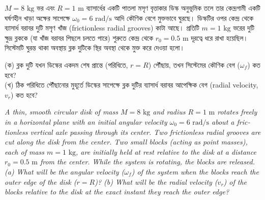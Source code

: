 \documentclass[12pt, a4paper]{article}
\begin{document}
\begin{tcolorbox}[questionbox={প্রশ্ন (Question) 7}]
\noindent
$M = 8\text{ kg}$ ভর এবং $R = 1\text{ m}$ ব্যাসার্ধের একটি পাতলা মসৃণ বৃত্তাকার ডিস্ক অনুভূমিক তলে তার কেন্দ্রগামী একটি ঘর্ষণহীন খাড়া অক্ষের সাপেক্ষে $\omega_0 = 6\text{ rad/s}$ আদি কৌণিক বেগে মুক্তভাবে ঘুরছে। ডিস্কটির ওপর কেন্দ্র থেকে ব্যাসার্ধ বরাবর দুটি মসৃণ খাঁজ (frictionless radial grooves) কাটা আছে। প্রতিটি $m = 1\text{ kg}$ ভরের দুটি ক্ষুদ্র ব্লককে (যা খাঁজ বরাবর পিছলে চলতে পারে) শুরুতে কেন্দ্র থেকে $r_0 = 0.5\text{ m}$ দূরত্বে ধরে রাখা হয়েছিল। সিস্টেমটি ঘুরন্ত থাকা অবস্থায় ব্লক দুটিকে স্থির অবস্থা থেকে মুক্ত করে দেওয়া হলো। 

\vspace{0.3em}
\noindent
(ক) ব্লক দুটি যখন ডিস্কের একদম শেষ প্রান্তে (পরিধিতে, $r = R$) পৌঁছায়, তখন সিস্টেমের কৌণিক বেগ ($\omega_f$) কত হবে? \\
(খ) ঠিক পরিধিতে পৌঁছানোর মুহূর্তে ডিস্কের সাপেক্ষে ব্লক দুটির ব্যাসার্ধ বরাবর আপেক্ষিক বেগ (radial velocity, $v_r$) কত হবে?

\vspace{0.8em}
\begin{english}
\noindent\textit{\color{darkgray}
A thin, smooth circular disk of mass $M = 8\text{ kg}$ and radius $R = 1\text{ m}$ rotates freely in a horizontal plane with an initial angular velocity $\omega_0 = 6\text{ rad/s}$ about a frictionless vertical axle passing through its center. Two frictionless radial grooves are cut along the disk from the center. Two small blocks (acting as point masses), each of mass $m = 1\text{ kg}$, are initially held at rest relative to the disk at a distance $r_0 = 0.5\text{ m}$ from the center. While the system is rotating, the blocks are released. (a) What will be the angular velocity ($\omega_f$) of the system when the blocks reach the outer edge of the disk ($r = R$)? (b) What will be the radial velocity ($v_r$) of the blocks relative to the disk at the exact instant they reach the outer edge?
}
\end{english}
\end{tcolorbox}
\end{document}
